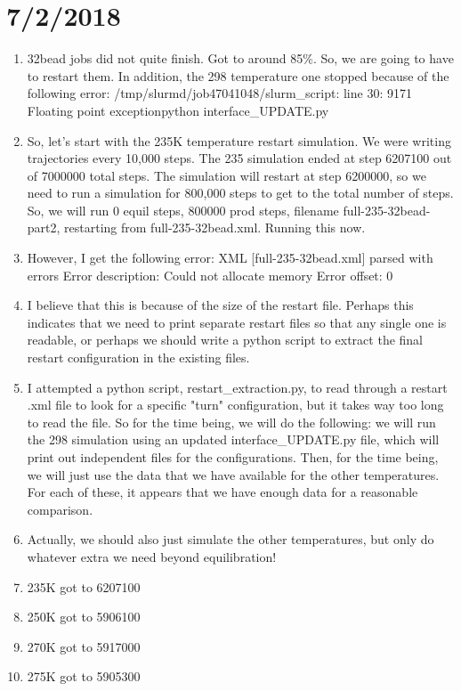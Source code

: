 \documentclass[12pt,reqno]{amsart}
\numberwithin{equation}{section}
\begin{document}
\section{7/2/2018}
\begin{enumerate}
\item 32bead jobs did not quite finish.  Got to around 85\%.  So, we are going to have to restart them.  In addition, the 298 temperature one stopped because of the following error: /tmp/slurmd/job47041048/slurm\_script: line 30:  9171 Floating point exceptionpython interface\_UPDATE.py
\item So, let's start with the 235K temperature restart simulation.  We were writing trajectories every 10,000 steps.  The 235 simulation ended at step 6207100 out of 7000000 total steps.  The simulation will restart at step 6200000, so we need to run a simulation for 800,000 steps to get to the total number of steps.  So, we will run 0 equil steps, 800000 prod steps, filename full-235-32bead-part2, restarting from full-235-32bead.xml.  Running this now.  
\item However, I get the following error: 
XML [full-235-32bead.xml] parsed with errors
Error description: Could not allocate memory
Error offset: 0
\item I believe that this is because of the size of the restart file.  Perhaps this indicates that we need to print separate restart files so that any single one is readable, or perhaps we should write a python script to extract the final restart configuration in the existing files.  
\item I attempted a python script, restart\_extraction.py, to read through a restart .xml file to look for a specific "turn" configuration, but it takes way too long to read the file.  So for the time being, we will do the following: we will run the 298 simulation using an updated interface\_UPDATE.py file, which will print out independent files for the configurations.  Then, for the time being, we will just use the data that we have available for the other temperatures. For each of these, it appears that we have enough data for a reasonable comparison.  
\item Actually, we should also just simulate the other temperatures, but only do whatever extra we need beyond equilibration!  
\item 235K got to 6207100
\item 250K got to 5906100
\item 270K got to 5917000
\item 275K got to 5905300

\end{enumerate}
\end{document}
